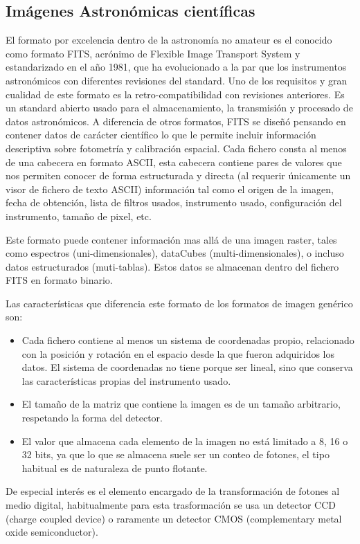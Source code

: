 	\subsection{Imágenes Astronómicas científicas}
	El formato por excelencia dentro de la astronomía no amateur es el conocido como formato FITS, acrónimo de Flexible Image Transport System y estandarizado en el año 1981, que ha evolucionado a la par que los instrumentos astronómicos con diferentes revisiones del standard. Uno de los requisitos y gran cualidad de este formato es la retro-compatibilidad con revisiones anteriores. 
	Es un standard abierto usado para el almacenamiento, la transmisión y procesado de datos astronómicos. A diferencia de otros formatos, FITS se diseñó pensando en contener datos de carácter científico lo que le permite incluir información descriptiva sobre fotometría y calibración espacial.
	Cada fichero consta al menos de una cabecera en formato ASCII, esta cabecera contiene pares de valores que nos permiten conocer de forma estructurada y directa (al requerir únicamente un visor de fichero de texto ASCII) información tal como el origen de la imagen, fecha de obtención, lista de filtros usados, instrumento usado, configuración del instrumento, tamaño de pixel, etc. 
	
	Este formato puede contener información mas allá de una imagen raster, tales como espectros (uni-dimensionales), dataCubes (multi-dimensionales), o incluso datos estructurados (muti-tablas). Estos datos se almacenan dentro del fichero FITS en formato binario.
	
	Las características que diferencia este formato de los formatos de imagen genérico son:
	\begin{itemize}
		\item Cada fichero contiene al menos un sistema de coordenadas propio, relacionado con la posición y rotación en el espacio desde la que fueron adquiridos los datos. El sistema de coordenadas no tiene porque ser lineal, sino que conserva las características propias del instrumento usado.
		\item El tamaño de la matriz que contiene la imagen es de un tamaño arbitrario, respetando la forma del detector.
		\item El valor que almacena cada elemento de la imagen no está limitado a 8, 16 o 32 bits, ya que lo que se almacena suele ser un conteo de fotones, el tipo habitual es de naturaleza de punto flotante.
	\end{itemize}
	De especial interés es el elemento encargado de la transformación de fotones al medio digital, habitualmente para esta trasformación se usa un detector CCD (charge coupled device) o raramente un detector CMOS (complementary metal oxide semiconductor).
	
